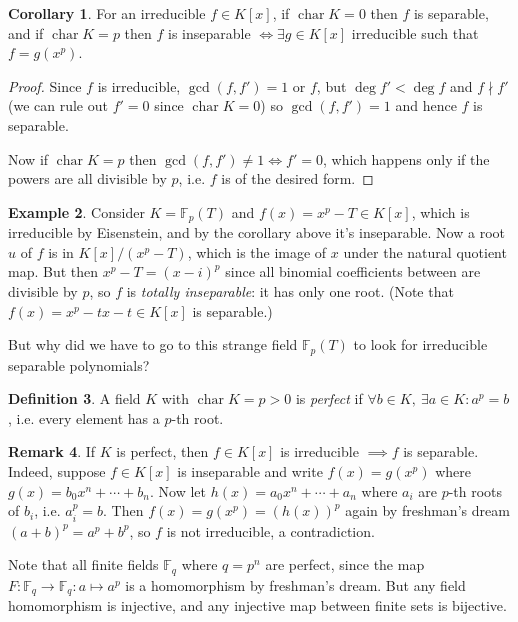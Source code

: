 \documentclass{article}
\newcommand{\F}{\mathbb{F}}
\newcommand{\Char}{\operatorname{char}}
\theoremstyle{definition}
\newtheorem{defn}{Definition}[subsection]
\newtheorem{coro}[defn]{Corollary}
\newtheorem{example}[defn]{Example}
\newtheorem{remark}[defn]{Remark}
\begin{document}
\begin{coro}
For an irreducible $f\in K[x]$, if $\Char K=0$ then $f$ is separable, and if $\Char K=p$ then $f$ is inseparable $\iff\exists g\in K[x]$ irreducible such that $f=g(x^p)$.
\end{coro}
\begin{proof}
Since $f$ is irreducible, $\gcd(f,f')=1$ or $f$, but $\deg f'<\deg f$ and $f\nmid f'$ (we can rule out $f'=0$ since $\Char K=0$) so $\gcd(f,f')=1$ and hence $f$ is separable.

Now if $\Char K=p$ then $\gcd(f,f')\neq 1\iff f'=0$, which happens only if the powers are all divisible by $p$, i.e. $f$ is of the desired form.
\end{proof}

\begin{example}
Consider $K=\F_p(T)$ and $f(x)=x^p-T\in K[x]$, which is irreducible by Eisenstein, and by the corollary above it's inseparable. Now a root $u$ of $f$ is in $K[x]/(x^p-T)$, which is the image of $x$ under the natural quotient map. But then $x^p-T=(x-i)^p$ since all binomial coefficients between are divisible by $p$, so $f$ is \textit{totally inseparable}: it has only one root. (Note that $f(x)=x^p-tx-t\in K[x]$ is separable.)

But why did we have to go to this strange field $\F_p(T)$ to look for irreducible separable polynomials?
\end{example}

\begin{defn}
A field $K$ with $\Char K=p>0$ is \textit{perfect} if $\forall b\in K,\ \exists a\in K:a^p=b$, i.e. every element has a $p$-th root.
\end{defn}

\begin{remark}
If $K$ is perfect, then $f\in K[x]$ is irreducible $\implies f$ is separable. Indeed, suppose $f\in K[x]$ is inseparable and write $f(x)=g(x^p)$ where $g(x)=b_0x^n+\cdots+b_n$. Now let $h(x)=a_0x^n+\cdots+a_n$ where $a_i$ are $p$-th roots of $b_i$, i.e. $a_i^p=b$. Then $f(x)=g(x^p)=(h(x))^p$ again by freshman's dream $(a+b)^p=a^p+b^p$, so $f$ is not irreducible, a contradiction.

Note that all finite fields $\F_q$ where $q=p^n$ are perfect, since the map $F:\F_q\rightarrow\F_q:a\mapsto a^p$ is a homomorphism by freshman's dream. But any field homomorphism is injective, and any injective map between finite sets is bijective.
\end{remark}
\end{document}
